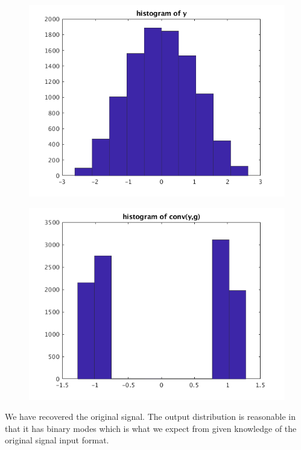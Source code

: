 \documentclass[12pt,letter]{article}
\begin{document}
\begin{enumerate}
\begin{itemize}
  \begin{figure}[H]
    \centering
    \includegraphics[width=12cm]{q10/part_b_hist_y.png}
  \end{figure}
  \begin{figure}[H]
    \centering
    \includegraphics[width=12cm]{q10/part_b_hist_z.png}
  \end{figure}
  We have recovered the original signal. The output distribution is reasonable in that it has binary modes which is what we expect from given knowledge of the original signal input format.

  \end{itemize}
  
\end{enumerate}
\end{document}
